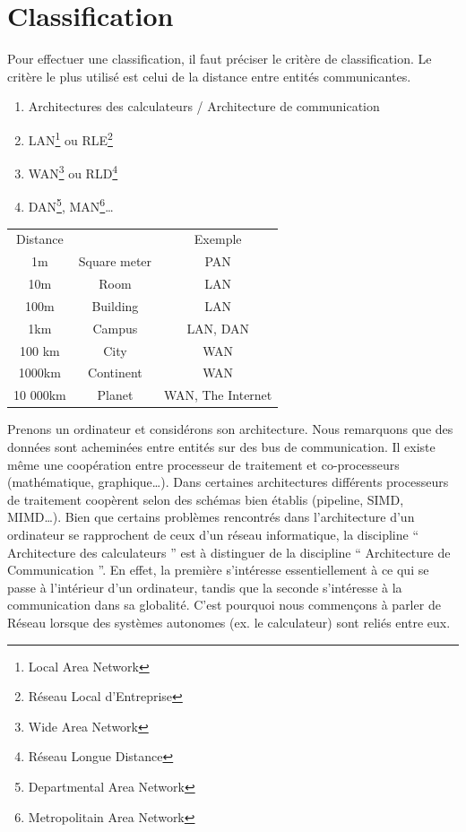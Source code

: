 \chapter{Classification}
Pour effectuer une classification, il faut préciser le critère de classification. Le critère le plus utilisé est celui de la distance entre entités communicantes.
	\begin{enumerate}
		\item Architectures des calculateurs / Architecture de communication
		\item LAN\footnote{Local Area Network} ou RLE\footnote{Réseau Local d'Entreprise}
		\item WAN\footnote{Wide Area Network} ou RLD\footnote{Réseau Longue Distance}
		\item DAN\footnote{Departmental Area Network}, MAN\footnote{Metropolitain Area Network}\ldots
	\end{enumerate}
	\begin{tabular}{| c c c |}
		\hline
		Distance & & Exemple\\
		1m & Square meter & PAN\\
		\hline
		10m & Room & LAN\\
		\hline
		100m & Building & LAN\\
		\hline
		1km & Campus & LAN, DAN\\
		\hline
		100 km & City & WAN\\
		\hline
		1000km & Continent & WAN\\
		\hline
		10 000km & Planet & WAN, The Internet\\
		\hline
	\end{tabular}
Prenons un ordinateur et considérons son architecture. Nous remarquons que des données sont acheminées entre entités sur des bus de communication. Il existe même une coopération entre processeur de traitement et co-processeurs (mathématique, graphique\ldots). Dans certaines architectures différents processeurs de traitement coopèrent selon des schémas bien établis (pipeline, SIMD, MIMD\ldots). Bien que certains problèmes rencontrés dans l'architecture d'un ordinateur se rapprochent de ceux d'un réseau informatique, la discipline `` Architecture des calculateurs '' est à distinguer de la discipline `` Architecture de Communication ''. En effet, la première s'intéresse essentiellement à ce qui se passe à l'intérieur d'un ordinateur, tandis que la seconde s'intéresse à la communication dans sa globalité. C'est pourquoi nous commençons à parler de Réseau lorsque des systèmes autonomes (ex. le calculateur) sont reliés entre eux.

